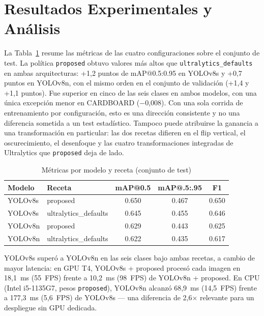 \documentclass[conference]{IEEEtran}
\begin{document}
\section{Resultados Experimentales y An\'alisis}

La Tabla~\ref{tab:metricas} resume las m\'etricas de las cuatro configuraciones sobre el
conjunto de test. La pol\'itica \texttt{proposed} obtuvo valores m\'as altos que
\texttt{ultralytics\_defaults} en ambas arquitecturas: +1,2 puntos de mAP@0.5:0.95 en YOLOv8s y
+0,7 puntos en YOLOv8n, con el mismo orden en el conjunto de validaci\'on (+1,4 y +1,1 puntos).
Fue superior en cinco de las seis clases en ambos modelos, con una \'unica excepci\'on menor en
CARDBOARD ($-$0,008). Con una sola corrida de entrenamiento por configuraci\'on, esto es una
direcci\'on consistente y no una diferencia sometida a un test estad\'istico. Tampoco puede
atribuirse la ganancia a una transformaci\'on en particular: las dos recetas difieren en el
flip vertical, el oscurecimiento, el desenfoque y las cuatro transformaciones integradas de
Ultralytics que \texttt{proposed} deja de lado.

\begin{table}[htbp]
\caption{M\'etricas por modelo y receta (conjunto de test)}
\begin{center}
\begin{tabular}{llccc}
\toprule
\textbf{Modelo} & \textbf{Receta} & \textbf{mAP@0.5} & \textbf{mAP@.5:.95} & \textbf{F1} \\
\midrule
YOLOv8s & proposed             & 0.650 & 0.467 & 0.650 \\
YOLOv8s & ultralytics\_defaults & 0.645 & 0.455 & 0.646 \\
YOLOv8n & proposed             & 0.629 & 0.443 & 0.625 \\
YOLOv8n & ultralytics\_defaults & 0.622 & 0.435 & 0.617 \\
\bottomrule
\end{tabular}
\label{tab:metricas}
\end{center}
\end{table}

YOLOv8s super\'o a YOLOv8n en las seis clases bajo ambas recetas, a cambio de mayor latencia:
en GPU T4, YOLOv8s + proposed proces\'o cada imagen en 18,1~ms (55~FPS) frente a 10,2~ms
(98~FPS) de YOLOv8n + proposed. En CPU (Intel i5-1135G7, pesos \texttt{proposed}), YOLOv8n
alcanz\'o 68,9~ms (14,5~FPS) frente a 177,3~ms (5,6~FPS) de YOLOv8s --- una diferencia de 2,6$\times$
relevante para un despliegue sin GPU dedicada.
\end{document}
